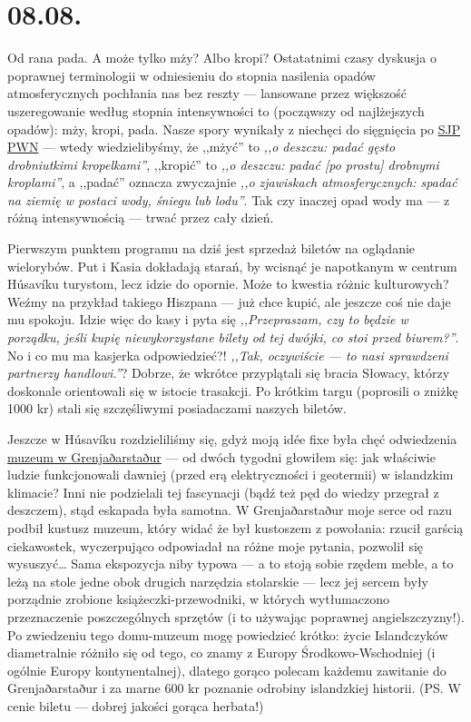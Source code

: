 \chapter*{08.08.}

Od rana pada. A może tylko mży? Albo kropi? Ostatatnimi czasy dyskusja o poprawnej terminologii w odniesieniu do stopnia nasilenia opadów atmosferycznych pochłania nas bez reszty --- lansowane przez większość uszeregowanie według stopnia intensywności to (począwszy od najlżejszych opadów): mży, kropi, pada. Nasze spory wynikały z niechęci do sięgnięcia po \href{http://sjp.pwn.pl/}{SJP PWN} --- wtedy wiedzielibyśmy, że ,,mżyć'' to \emph{,,o deszczu: padać gęsto drobniutkimi kropelkami''}, ,,kropić'' to \emph{,,o deszczu: padać [po prostu] drobnymi kroplami''}, a ,,padać'' oznacza zwyczajnie \emph{,,o zjawiskach atmosferycznych: spadać na ziemię w postaci wody, śniegu lub lodu''}. Tak czy inaczej opad wody ma --- z różną intensywnością --- trwać przez cały dzień.

Pierwszym punktem programu na dziś jest sprzedaż biletów na oglądanie wielorybów. Put i Kasia dokładają starań, by wcisnąć je napotkanym w centrum Húsavíku turystom, lecz idzie do opornie. Może to kwestia różnic kulturowych? Weźmy na przykład takiego Hiszpana --- już chce kupić, ale jeszcze coś nie daje mu spokoju. Idzie więc do kasy i pyta się \emph{,,Przepraszam, czy to będzie w porządku, jeśli kupię niewykorzystane bilety od tej dwójki, co stoi przed biurem?''}. No i co mu ma kasjerka odpowiedzieć?! \emph{,,Tak, oczywiście --- to nasi sprawdzeni partnerzy handlowi.''}? Dobrze, że wkrótce przyplątali się bracia Słowacy, którzy doskonale orientowali się w istocie trasakcji. Po krótkim targu (poprosili o zniżkę 1000 kr) stali się szczęśliwymi posiadaczami naszych biletów.


Jeszcze w Húsavíku rozdzieliliśmy się, gdyż moją idée fixe była chęć odwiedzenia \href{http://www.visithusavik.com/attractions/the-turf-house-museum/}{muzeum w Grenjaðarstaður} --- od dwóch tygodni głowiłem się: jak właściwie ludzie funkcjonowali dawniej (przed erą elektryczności i geotermii) w islandzkim klimacie? Inni nie podzielali tej fascynacji (bądź też pęd do wiedzy przegrał z deszczem), stąd eskapada była samotna. W Grenjaðarstaður moje serce od razu podbił kustusz muzeum, który widać że był kustoszem z powołania: rzucił garścią ciekawostek, wyczerpująco odpowiadał na różne moje pytania, pozwolił się wysuszyć… Sama ekspozycja niby typowa --- a to stoją sobie rzędem meble, a to leżą na stole jedne obok drugich narzędzia stolarskie --- lecz jej sercem były porządnie zrobione książeczki-przewodniki, w których wytłumaczono przeznaczenie poszczególnych sprzętów (i to używając poprawnej angielszczyzny!). Po zwiedzeniu tego domu-muzeum mogę powiedzieć krótko: życie Islandczyków diametralnie różniło się od tego, co znamy z Europy Środkowo-Wschodniej (i ogólnie Europy kontynentalnej), dlatego gorąco polecam każdemu zawitanie do Grenjaðarstaður i za marne 600 kr poznanie odrobiny islandzkiej historii. (PS. W cenie biletu --- dobrej jakości gorąca herbata!)

